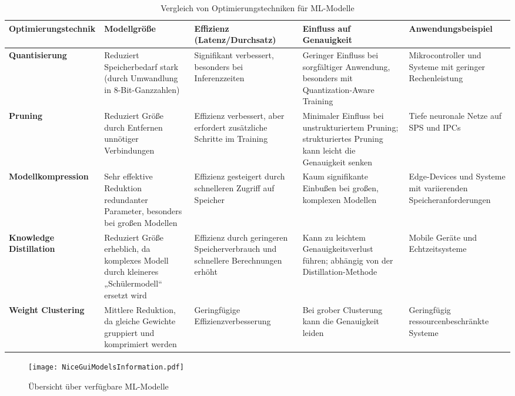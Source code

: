 \begin{sidewaystable}[h!]
    \centering
    \caption{Vergleich von Optimierungstechniken für ML-Modelle}
    \begin{tabular}{|l|p{4cm}|p{4cm}|p{4cm}|p{4cm}|}
    \hline
    \textbf{Optimierungstechnik} & \textbf{Modellgröße} & \textbf{Effizienz (Latenz/Durchsatz)} & \textbf{Einfluss auf Genauigkeit} & \textbf{Anwendungsbeispiel} \\ \hline
    \textbf{Quantisierung} & Reduziert Speicherbedarf stark (durch Umwandlung in 8-Bit-Ganzzahlen) & Signifikant verbessert, besonders bei Inferenzzeiten & Geringer Einfluss bei sorgfältiger Anwendung, besonders mit Quantization-Aware Training & Mikrocontroller und Systeme mit geringer Rechenleistung \\ \hline
    \textbf{Pruning} & Reduziert Größe durch Entfernen unnötiger Verbindungen & Effizienz verbessert, aber erfordert zusätzliche Schritte im Training & Minimaler Einfluss bei unstrukturiertem Pruning; strukturiertes Pruning kann leicht die Genauigkeit senken & Tiefe neuronale Netze auf SPS und IPCs \\ \hline
    \textbf{Modellkompression} & Sehr effektive Reduktion redundanter Parameter, besonders bei großen Modellen & Effizienz gesteigert durch schnelleren Zugriff auf Speicher & Kaum signifikante Einbußen bei großen, komplexen Modellen & Edge-Devices und Systeme mit variierenden Speicheranforderungen \\ \hline
    \textbf{Knowledge Distillation} & Reduziert Größe erheblich, da komplexes Modell durch kleineres „Schülermodell“ ersetzt wird & Effizienz durch geringeren Speicherverbrauch und schnellere Berechnungen erhöht & Kann zu leichtem Genauigkeitsverlust führen; abhängig von der Distillation-Methode & Mobile Geräte und Echtzeitsysteme \\ \hline
    \textbf{Weight Clustering} & Mittlere Reduktion, da gleiche Gewichte gruppiert und komprimiert werden & Geringfügige Effizienzverbesserung & Bei grober Clusterung kann die Genauigkeit leiden & Geringfügig ressourcenbeschränkte Systeme \\ \hline
    \end{tabular}
    \label{tab:appendix_table}
\end{sidewaystable}

\begin{figure}[h!]
    \centering
    \texttt{[image: NiceGuiModelsInformation.pdf]} 
    \caption{Übersicht über verfügbare ML-Modelle} 
    \label{fig:NiceGUI_Models}
\end{figure}

